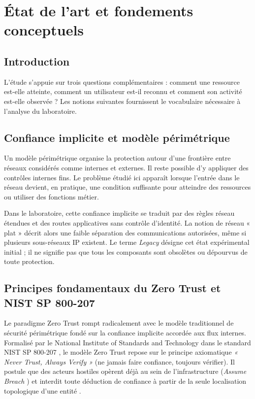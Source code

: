 \documentclass[a4paper,12pt]{report}
\begin{document}
\chapter{État de l'art et fondements conceptuels}
\section*{Introduction}
L'étude s'appuie sur trois questions complémentaires : comment une ressource est-elle atteinte, comment un utilisateur est-il reconnu et comment son activité est-elle observée ? Les notions suivantes fournissent le vocabulaire nécessaire à l'analyse du laboratoire.

\section{Confiance implicite et modèle périmétrique}
Un modèle périmétrique organise la protection autour d'une frontière entre réseaux considérés comme internes et externes. Il reste possible d'y appliquer des contrôles internes fins. Le problème étudié ici apparaît lorsque l'entrée dans le réseau devient, en pratique, une condition suffisante pour atteindre des ressources ou utiliser des fonctions métier.

Dans le laboratoire, cette confiance implicite se traduit par des règles réseau étendues et des routes applicatives sans contrôle d'identité. La notion de réseau « plat » décrit alors une faible séparation des communications autorisées, même si plusieurs sous-réseaux IP existent. Le terme \textit{Legacy} désigne cet état expérimental initial ; il ne signifie pas que tous les composants sont obsolètes ou dépourvus de toute protection.

\section{Principes fondamentaux du Zero Trust et NIST SP 800-207}
\label{sec:nist-core}
Le paradigme Zero Trust rompt radicalement avec le modèle traditionnel de sécurité périmétrique fondé sur la confiance implicite accordée aux flux internes. Formalisé par le National Institute of Standards and Technology dans le standard NIST SP 800-207 \cite{nist}, le modèle Zero Trust repose sur le principe axiomatique \textit{« Never Trust, Always Verify »} (ne jamais faire confiance, toujours vérifier). Il postule que des acteurs hostiles opèrent déjà au sein de l'infrastructure (\textit{Assume Breach} \cite{dod_zta}) et interdit toute déduction de confiance à partir de la seule localisation topologique d'une entité \cite{saltzer1975}.
\end{document}
